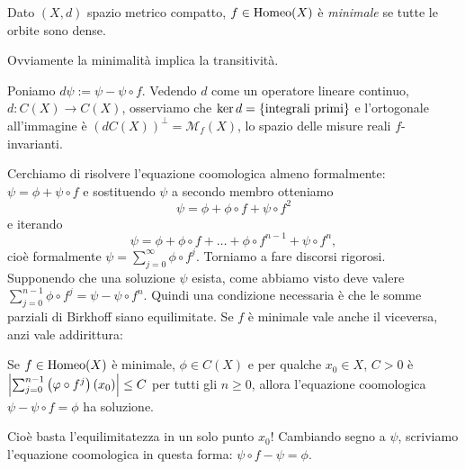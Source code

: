 \begin{defi}Dato $(X,d)$ spazio metrico compatto, $f\in\operatorname{Homeo}(X)$ è \emph{minimale} se tutte le orbite sono dense.
\end{defi}

\begin{oss}Ovviamente la minimalità implica la transitività.
\end{oss}

Poniamo $d\psi:=\psi-\psi\circ f$. Vedendo $d$ come un operatore lineare continuo,
$d:C(X)\to C(X)$, osserviamo che $\ker d=\left\{\text{integrali primi}\right\}$ e l'ortogonale all'immagine è $(dC(X))^\perp
=\mathcal{M}_f(X)$, lo spazio delle misure reali $f$-invarianti.

Cerchiamo di risolvere l'equazione coomologica almeno formalmente:
$\psi=\phi+\psi\circ f$ e sostituendo $\psi$ a secondo membro otteniamo
\[ \psi=\phi+\phi\circ f+\psi\circ f^2 \]
e iterando
\[ \psi=\phi+\phi\circ f+\dots+\phi\circ f^{n-1}+\psi\circ f^n, \]
cioè formalmente $\psi=\sum_{j=0}^\infty \phi\circ f^j$. Torniamo a fare discorsi rigorosi. \\
Supponendo che una soluzione $\psi$ esista, come abbiamo visto deve valere
$\sum_{j=0}^{n-1}\phi\circ f^j=\psi-\psi\circ f^n$. Quindi una condizione necessaria è che le somme parziali
di Birkhoff siano equilimitate. Se $f$ è minimale vale anche il viceversa, anzi vale addirittura:
\begin{teo}Se $f\in\operatorname{Homeo}(X)$ è minimale, $\phi\in C(X)$ e per qualche $x_0\in X$, $C>0$
è $\left|\sum_{j=0}^{n-1}\left(\varphi\circ f^j\right)(x_0)\right|\le C$ per tutti gli $n\ge 0$, allora l'equazione coomologica
$\psi-\psi\circ f=\phi$ ha soluzione.
\end{teo}

Cioè basta l'equilimitatezza in un solo punto $x_0$! Cambiando segno a $\psi$, scriviamo l'equazione coomologica
in questa forma: $\psi\circ f-\psi=\phi$.

